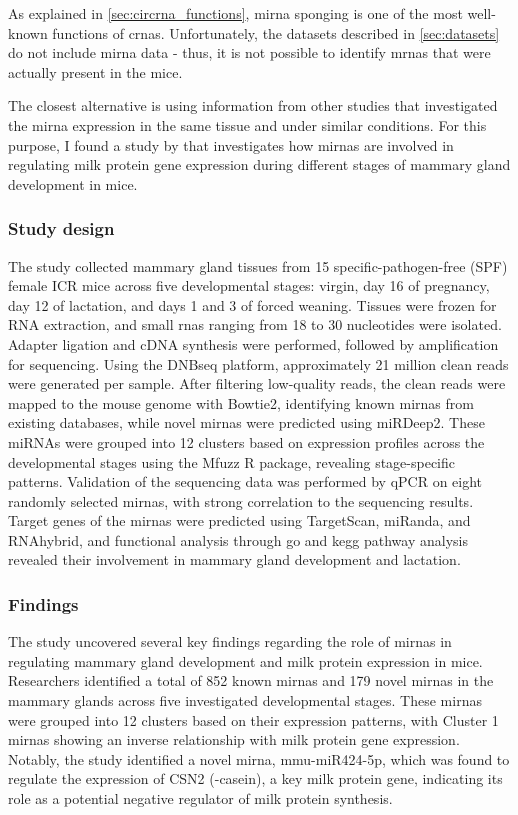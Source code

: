 As explained in \cref{sec:circrna_functions}, \gls{mirna} sponging is one of
the most well-known functions of \glspl{crna}.
Unfortunately, the datasets described in \cref{sec:datasets} do not include
\gls{mirna} data - thus, it is not possible to identify \glspl{mrna} that were
actually present in the mice.

The closest alternative is using information from other studies that
investigated the \gls{mirna} expression in the same tissue and under similar
conditions.
For this purpose, I found a study by \textcite{wang_dynamic_2022} that
investigates how \glspl{mirna} are involved in regulating milk protein gene
expression during different stages of mammary gland development in mice.

\subsubsection{Study design}
The study collected mammary gland tissues from 15 specific-pathogen-free (SPF)
female ICR mice across five developmental stages: virgin, day 16 of pregnancy,
day 12 of lactation, and days 1 and 3 of forced weaning.
Tissues were frozen for RNA extraction, and small \glspl{rna} ranging from 18
to 30 nucleotides were isolated.
Adapter ligation and cDNA synthesis were performed, followed by amplification
for sequencing.
Using the DNBseq platform, approximately 21 million clean reads were generated
per sample.
After filtering low-quality reads, the clean reads were mapped to the mouse
genome with Bowtie2, identifying known \glspl{mirna} from existing databases,
while novel \glspl{mirna} were predicted using miRDeep2.
These miRNAs were grouped into 12 clusters based on expression profiles across
the developmental stages using the Mfuzz R package, revealing stage-specific
patterns.
Validation of the sequencing data was performed by qPCR on eight randomly
selected \glspl{mirna}, with strong correlation to the sequencing results.
Target genes of the \glspl{mirna} were predicted using TargetScan, miRanda, and
RNAhybrid, and functional analysis through \gls{go} and \gls{kegg} pathway
analysis revealed their involvement in mammary gland development and
lactation\supercite{wang_dynamic_2022}.

\subsubsection{Findings}
The study uncovered several key findings regarding the role of \glspl{mirna} in
regulating mammary gland development and milk protein expression in mice.
Researchers identified a total of 852 known \glspl{mirna} and 179 novel
\glspl{mirna} in the mammary glands across five investigated developmental
stages.
These \glspl{mirna} were grouped into 12 clusters based on their expression
patterns, with Cluster 1 \glspl{mirna} showing an inverse relationship with
milk protein gene expression.
Notably, the study identified a novel \gls{mirna}, mmu-miR424-5p, which was
found to regulate the expression of CSN2 (\textbeta{}-casein), a key milk
protein gene, indicating its role as a potential negative regulator of milk
protein synthesis\supercite{wang_dynamic_2022}.

